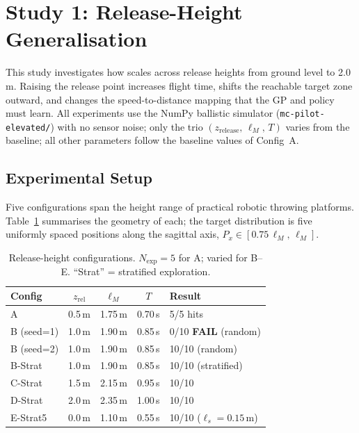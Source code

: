 \section{Study 1: Release-Height Generalisation}
\label{sec:study1}

This study investigates how \mcpilot{} scales across release heights from ground level
to 2.0\,m.
Raising the release point increases flight time, shifts the reachable target zone
outward, and changes the speed-to-distance mapping that the GP and policy must learn.
All experiments use the NumPy ballistic simulator (\texttt{mc-pilot-elevated/}) with
no sensor noise; only the trio $(z_{\mathrm{release}},\, \ell_M,\, T)$ varies from
the baseline; all other parameters follow the baseline values of Config~A.

\subsection{Experimental Setup}
\label{sec:study1:setup}

Five configurations span the height range of practical robotic throwing platforms.
Table~\ref{tab:height_configs} summarises the geometry of each; the target
distribution is five uniformly spaced positions along the sagittal axis,
$P_x \in [0.75\,\ell_M,\, \ell_M]$.

\begin{table}[t]
  \centering
  \caption{Release-height configurations. $N_{\mathrm{exp}} = 5$ for A; varied for B--E.
           ``Strat'' = stratified exploration.}
  \label{tab:height_configs}
  \small
  \begin{tabular}{lcccl}
    \toprule
    Config & $z_{\mathrm{rel}}$ & $\ell_M$ & $T$ & Result \\
    \midrule
    A          & 0.5\,m & 1.75\,m & 0.70\,s & 5/5 hits \\
    B (seed=1) & 1.0\,m & 1.90\,m & 0.85\,s & 0/10 \textbf{FAIL} (random) \\
    B (seed=2) & 1.0\,m & 1.90\,m & 0.85\,s & 10/10 (random) \\
    B-Strat    & 1.0\,m & 1.90\,m & 0.85\,s & 10/10 (stratified) \\
    C-Strat    & 1.5\,m & 2.15\,m & 0.95\,s & 10/10 \\
    D-Strat    & 2.0\,m & 2.35\,m & 1.00\,s & 10/10 \\
    E-Strat5   & 0.0\,m & 1.10\,m & 0.55\,s & 10/10 ($\ell_s = 0.15$\,m) \\
    \bottomrule
  \end{tabular}
\end{table}

